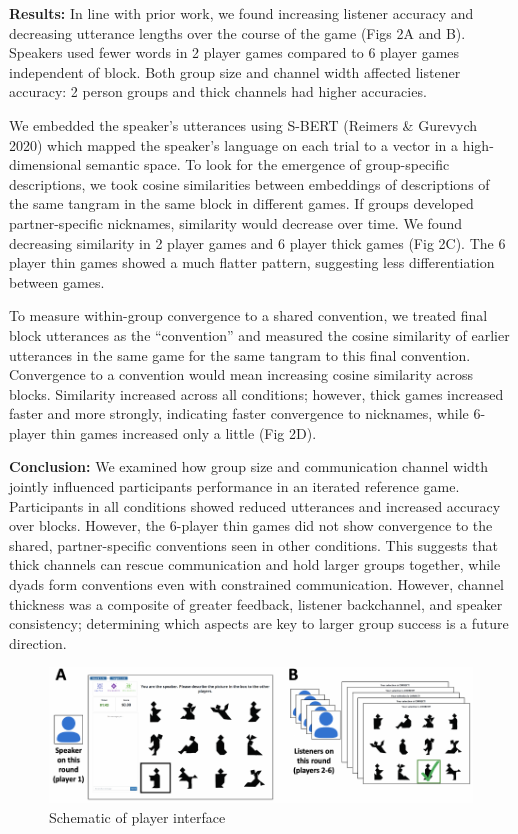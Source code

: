 \documentclass[11pt,a4paper]{article}
\begin{document}

\textbf{Results:} In line with prior work, we found increasing listener accuracy and decreasing utterance lengths over the course of the game (Figs 2A and B). Speakers used fewer words in 2 player games compared to 6 player games independent of block. Both group size and channel width affected listener accuracy: 2 person groups and thick channels had higher accuracies. 

We embedded the speaker's utterances using S-BERT (Reimers \& Gurevych 2020) which mapped the speaker's language on each trial to a vector in a high-dimensional semantic space. %
To look for the emergence of group-specific descriptions, we took cosine similarities between embeddings of descriptions of the same tangram in the same block in different games. If groups developed partner-specific nicknames, similarity would decrease over time. We found decreasing similarity in 2 player games and 6 player thick games (Fig 2C). The 6 player thin games showed a much flatter pattern, suggesting less differentiation between games. 

To measure within-group convergence to a shared convention, we treated final block utterances as the ``convention'' and measured the cosine similarity of earlier utterances in the same game for the same tangram to this final convention. Convergence to a convention would mean increasing cosine similarity across blocks. Similarity increased across all conditions; however, thick games increased faster and more strongly, indicating faster convergence to nicknames, while 6-player thin games increased only a little (Fig 2D). 

\textbf{Conclusion:} We examined how group size and communication channel width jointly influenced participants performance in an iterated reference game. Participants in all conditions showed reduced utterances and increased accuracy over blocks. However, the 6-player thin games did not show convergence to the shared, partner-specific conventions seen in other conditions. This suggests that thick channels can rescue communication and hold larger groups together, while dyads form conventions even with constrained communication. However, channel thickness was a composite of greater feedback, listener backchannel, and speaker consistency; determining which aspects are key to larger group success is a future direction.  
\newpage

\begin{figure}
	\includegraphics[width=\textwidth]{../images/interface-1.pdf}
	\caption{Schematic of player interface}
\end{figure}
\end{document}
